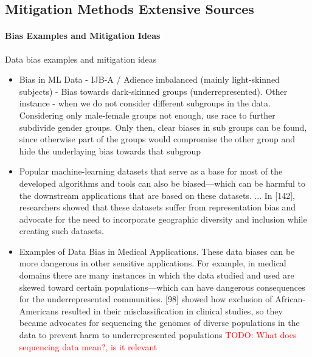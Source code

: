 \documentclass[12pt, a4paper, oneside]{book}   	%
\renewcommand{\todo}[1]{\textcolor{red}{TODO: #1}}
\newif\ifrawcitationactive
\newcommand{\rawcitationstart}{\color{purple}\rawcitationactivetrue}
\newcommand{\rawcitationusedstart}{\color{violet}}
\newcommand{\rawcitationusedend}{%
	\ifrawcitationactive
	\color{purple}  %
	\else
	\color{black}  %
	\fi
}
\begin{document}
		\rawcitationstart
		\subsection{Mitigation Methods Extensive Sources}
			
			\paragraph{Bias Examples and Mitigation Ideas}
			Data bias examples and mitigation ideas
			\begin{itemize}
				\item Bias in ML Data - \autocite{M24_Buolamwini_2018} IJB-A / Adience imbalanced (mainly light-skinned subjects) - Bias towards dark-skinned groups (underrepresented). Other instance - when we do not consider different subgroups in the data. Considering only male-female groups not enough, use race to further subdivide gender groups. Only then, clear biases in sub groups can be found, since otherwise part of the groups would  compromise the other group and hide the underlaying bias towards that subgroup \autocite{Mehrabi_2021}
				\rawcitationusedstart
				\item Popular machine-learning datasets that serve as a base for most of the developed algorithms and tools can also be biased—which can be harmful to the downstream applications that are based on these datasets. ... In [142], researchers showed that these datasets suffer from representation bias and advocate for the need to incorporate geographic diversity and inclusion while creating such datasets. \autocite{Mehrabi_2021}
				\rawcitationusedend
				\item Examples of Data Bias in Medical Applications. These data biases can be more dangerous in other sensitive applications. For example, in medical domains there are many instances in which the data studied and used are skewed toward certain populations—which can have dangerous consequences for the underrepresented communities. [98] showed how exclusion of African-Americans resulted in their misclassification in clinical studies, so they became advocates for sequencing the genomes of diverse populations in the data to prevent harm to underrepresented populations \autocite{Mehrabi_2021} \todo{What does sequencing data mean?, is it relevant}
			\end{itemize}
			
\end{document}
